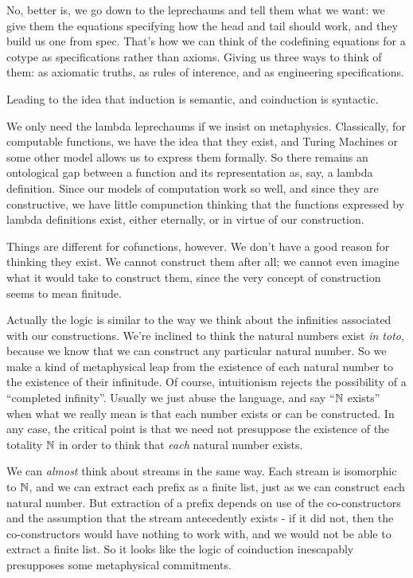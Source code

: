 \documentclass{article}
\begin{document}
No, better is, we go down to the leprechauns and tell them what we
want: we give them the equations specifying how the head and tail
should work, and they build us one from spec. That's how we can think
of the codefining equations for a cotype as specifications rather than
axioms. Giving us three ways to think of them: as axiomatic truths, as
rules of interence, and as engineering specifications.

Leading to the idea that induction is semantic, and coinduction is
syntactic.

We only need the lambda leprechaums if we insist on metaphysics.
Classically, for computable functions, we have the idea that they
exist, and Turing Machines or some other model allows us to express
them formally. So there remains an ontological gap between a function
and its representation as, say, a lambda definition. Since our models
of computation work so well, and since they are constructive, we have
little compunction thinking that the functions expressed by lambda
definitions exist, either eternally, or in virtue of our construction.

Things are different for cofunctions, however. We don't have a good
reason for thinking they exist. We cannot construct them after all; we
cannot even imagine what it would take to construct them, since the
very concept of construction seems to mean finitude.

Actually the logic is similar to the way we think about the infinities
associated with our constructions. We're inclined to think the natural
numbers exist \textit{in toto}, because we know that we can construct
any particular natural number. So we make a kind of metaphysical leap
from the existence of each natural number to the existence of their
infinitude. Of course, intuitionism rejects the possibility of a
``completed infinity''. Usually we just abuse the language, and say
``\(\mathbb{N}\) exists'' when what we really mean is that each number
exists or can be constructed. In any case, the critical point is that
we need not presuppose the existence of the totality \(\mathbb{N}\) in order
to think that \textit{each} natural number exists.

We can \textit{almost} think about streams in the same way. Each
stream is isomorphic to \(\mathbb{N}\), and we can extract each prefix as a
finite list, just as we can construct each natural number. But
extraction of a prefix depends on use of the co-constructors and the
assumption that the stream antecedently exists - if it did not, then
the co-constructors would have nothing to work with, and we would not
be able to extract a finite list. So it looks like the logic of
coinduction inescapably presupposes some metaphysical commitments.
\end{document}
